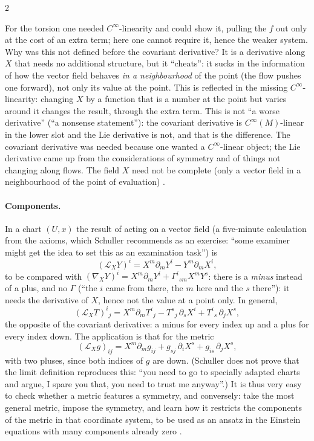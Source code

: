 \begin{paracol}{2}
\begin{coursenote}
For the torsion one needed $C^\infty$-linearity and could show it, pulling the $f$ out only at the cost of an extra term; here one cannot require it, hence the weaker system. Why was this not defined before the covariant derivative? It is a derivative along $X$ that needs no additional structure, but it ``cheats'': it sucks in the information of how the vector field behaves \emph{in a neighbourhood} of the point (the flow pushes one forward), not only its value at the point. This is reflected in the missing $C^\infty$-linearity: changing $X$ by a function that is a number at the point but varies around it changes the result, through the extra term. This is not ``a worse derivative'' (``a nonsense statement''): the covariant derivative is $C^\infty(M)$-linear in the lower slot and the Lie derivative is not, and that is the difference. The covariant derivative was needed because one wanted a $C^\infty$-linear object; the Lie derivative came up from the considerations of symmetry and of things not changing along flows. The field $X$ need not be complete (only a vector field in a neighbourhood of the point of evaluation) .
\end{coursenote}

\paragraph{Components.} In a chart $(U,x)$ the result of acting on a vector field (a five-minute calculation from the axioms, which Schuller recommends as an exercise: ``some examiner might get the idea to set this as an examination task'') is
\[
  (\mathcal L_XY)^i=X^m\partial_mY^i-Y^m\partial_mX^i,
\]
to be compared with $(\nabla_XY)^i=X^m\partial_mY^i+\Gamma^i{}_{sm}X^mY^s$: there is a \emph{minus} instead of a plus, and no $\Gamma$ (``the $i$ came from there, the $m$ here and the $s$ there''): it needs the derivative of $X$, hence not the value at a point only. In general,
\[
  (\mathcal L_XT)^i{}_j=X^m\partial_mT^i{}_j-T^s{}_j\,\partial_sX^i+T^i{}_s\,\partial_jX^s,
\]
the opposite of the covariant derivative: a minus for every index up and a plus for every index down. The application is that for the metric
\[
  (\mathcal L_Xg)_{ij}=X^m\partial_mg_{ij}+g_{sj}\,\partial_iX^s+g_{is}\,\partial_jX^s,
\]
with two pluses, since both indices of $g$ are down. (Schuller does not prove that the limit definition reproduces this: ``you need to go to specially adapted charts and argue, I spare you that, you need to trust me anyway''.) It is thus very easy to check whether a metric features a symmetry, and conversely: take the most general metric, impose the symmetry, and learn how it restricts the components of the metric in that coordinate system, to be used as an ansatz in the Einstein equations with many components already zero .


\end{paracol}
